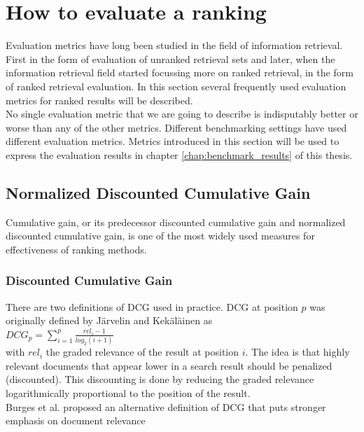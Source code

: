 \section{How to evaluate a ranking}
\label{sec:how_to_evaluate_a_ranking}
Evaluation metrics have long been studied in the field of information retrieval. First in the form of evaluation of unranked retrieval sets and later, when the information retrieval field started focussing more on ranked retrieval, in the form of ranked retrieval evaluation. In this section several frequently used evaluation metrics for ranked results will be described.\\

No single evaluation metric that we are going to describe is indisputably better or worse than any of the other metrics. Different benchmarking settings have used different evaluation metrics. Metrics introduced in this section will be used to express the evaluation results in chapter \ref{chap:benchmark_results} of this thesis.
\subsection{Normalized Discounted Cumulative Gain}
Cumulative gain, or its predecessor discounted cumulative gain and normalized discounted cumulative gain, is one of the most widely used measures for effectiveness of ranking methods.
\subsubsection{Discounted Cumulative Gain}
There are two definitions of \ac{DCG} used in practice. \ac{DCG} at position $p$ was originally defined by J{\"a}rvelin and Kek{\"a}l{\"a}inen \cite{Jarvelin2002} as\\

$DCG_p = \sum\nolimits_{i=1}^p \frac{rel_i-1}{log_2(i+1)}$\\

with $rel_i$ the graded relevance of the result at position $i$. The idea is that highly relevant documents that appear lower in a search result should be penalized (discounted). This discounting is done by reducing the graded relevance  logarithmically proportional to the position of the result.\\

Burges et al. \cite{Burges2005} proposed an alternative definition of \ac{DCG} that puts stronger emphasis on document relevance\\

